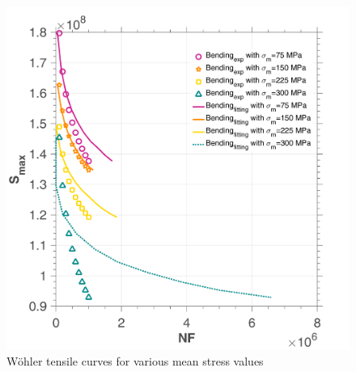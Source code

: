 \begin{figure}[!h]
	\centering
	\includegraphics[width=\textwidth]{figures//10HNAP_b1D_m_sn.png} 
	\caption{Wöhler tensile curves for various mean stress values}
	\label{fig.b1Dm10HNAPsn}
\end{figure}


